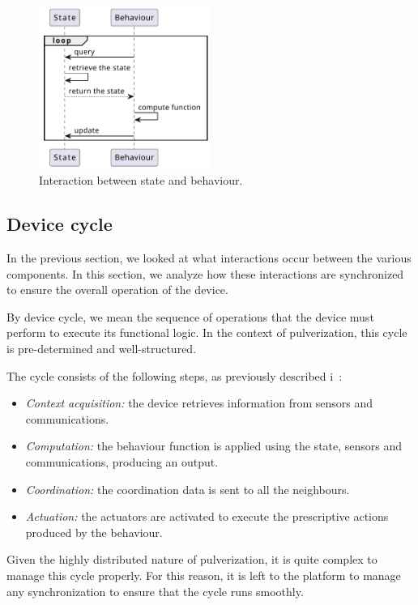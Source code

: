 \begin{figure}[ht]
	\centering
	\includegraphics[width=0.5\textwidth]{figures/sequence-diagram-state.pdf}
	\caption{Interaction between state and behaviour.}
	\label{fig:framework-components-interaction-2-state-behaviour}
\end{figure}

\subsection{Device cycle}
\label{sec:framework-device-cycle}

In the previous section, we looked at what interactions occur between the various components. In this section, we analyze how these interactions
are synchronized to ensure the overall operation of the device.

By device cycle, we mean the sequence of operations that the device must perform to execute its functional logic. In the context of pulverization,
this cycle is pre-determined and well-structured.

The cycle consists of the following steps, as previously described i~:

\begin{itemize}
	\item \emph{Context acquisition:} the device retrieves information from sensors and communications.
	\item \emph{Computation:} the behaviour function is applied using the state, sensors and communications, producing an output.
	\item \emph{Coordination:} the coordination data is sent to all the neighbours.
	\item \emph{Actuation:} the actuators are activated to execute the prescriptive actions produced by the behaviour.
\end{itemize}

Given the highly distributed nature of pulverization, it is quite complex to manage this cycle properly. For this reason, it is left to the platform
to manage any synchronization to ensure that the cycle runs smoothly.

